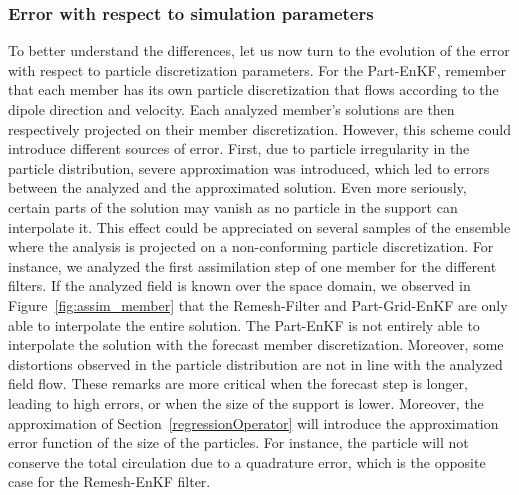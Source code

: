 \subsubsection{Error with respect to simulation parameters}

To better understand the differences, let us now turn to the evolution of the error with respect to particle discretization parameters. For the Part-EnKF, remember that each member has its own particle discretization that flows according to the dipole direction and velocity. Each analyzed member's solutions are then respectively projected on their member discretization. However, this scheme could introduce different sources of error. First, due to particle irregularity in the particle distribution, severe approximation was introduced, which led to errors between the analyzed and the approximated solution. Even more seriously, certain parts of the solution may vanish as no particle in the support can interpolate it. This effect could be appreciated on several samples of the ensemble where the analysis is projected on a non-conforming particle discretization. For instance, we analyzed the first assimilation step of one member for the different filters. If the analyzed field is known over the space domain, we observed in Figure~\ref{fig:assim_member} that the Remesh-Filter and Part-Grid-EnKF are only able to interpolate the entire solution. The Part-EnKF is not entirely able to interpolate the solution with the forecast member discretization.
Moreover, some distortions observed in the particle distribution are not in line with the analyzed field flow. These remarks are more critical when the forecast step is longer, leading to high errors, or when the size of the support is lower. Moreover, the approximation of Section~\ref{regressionOperator} will introduce the approximation error function of the size of the particles. For instance, the particle will not conserve the total circulation due to a quadrature error, which is the opposite case for the Remesh-EnKF filter.

